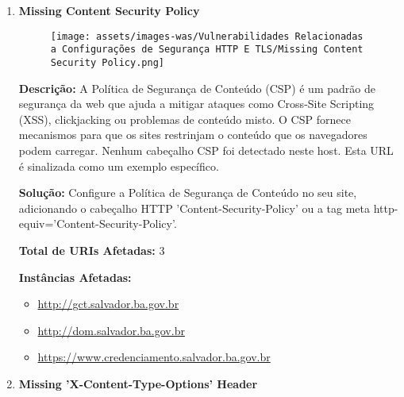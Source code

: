 \documentclass[a4paper,12pt]{article}
\begin{document}
\begin{enumerate}
\item \textbf{Missing Content Security Policy}

                        \begin{figure}[h!]
                        \centering
                        \texttt{[image: assets/images-was/Vulnerabilidades Relacionadas a Configurações de Segurança HTTP E TLS/Missing Content Security Policy.png]}
                        \end{figure}
                        \FloatBarrier
                        \textbf{Descrição:} A Política de Segurança de Conteúdo (CSP) é um padrão de segurança da web que ajuda a mitigar ataques como Cross-Site Scripting (XSS), clickjacking ou problemas de conteúdo misto. O CSP fornece mecanismos para que os sites restrinjam o conteúdo que os navegadores podem carregar.
 Nenhum cabeçalho CSP foi detectado neste host. Esta URL é sinalizada como um exemplo específico.

\textbf{Solução:} Configure a Política de Segurança de Conteúdo no seu site, adicionando o cabeçalho HTTP 'Content-Security-Policy' ou a tag meta http-equiv='Content-Security-Policy'.

\textbf{Total de URIs Afetadas:} 3

\textbf{Instâncias Afetadas:}
\begin{itemize}
    \item \url{http://gct.salvador.ba.gov.br}
    \item \url{http://dom.salvador.ba.gov.br}
    \item \url{https://www.credenciamento.salvador.ba.gov.br}
\end{itemize}

\item \textbf{Missing 'X-Content-Type-Options' Header}


\end{enumerate}
\end{document}
